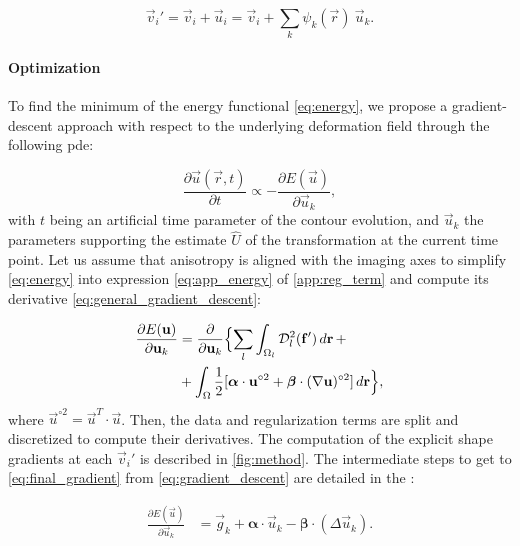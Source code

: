   \begin{equation}
  \vec{v}_i' = \vec{v}_i + \vec{u}_i = \vec{v}_i + \sum_k \psi_k(\vec{r}) \: \vec{u}_k.
  \label{eq:nodes_tfm}
  \end{equation}


\paragraph*{Optimization}
\label{sec:gradient_descent}
To find the minimum of the energy functional \eqref{eq:energy},
  we propose a gradient-descent approach with respect to the underlying
  deformation field through the following \gls*{pde}:

  \begin{equation}
  \frac{\partial \vec{u}(\vec{r},t)}{\partial t} \propto - \frac{\partial E(\vec{u})}{\partial \vec{u}_k},
  \label{eq:general_gradient_descent}
  \end{equation}
%
  with $t$ being an artificial time parameter of the contour
  evolution, and $\vec{u}_k$ the parameters supporting the estimate
  $\hat{U}$ of the transformation at the current time point.
Let us assume that anisotropy is aligned with the imaging axes to simplify
  \eqref{eq:energy} into expression \eqref{eq:app_energy} of \ref{app:reg_term}
  and compute its derivative \eqref{eq:general_gradient_descent}:

  \begin{align}
  \frac{\partial E(\vec{u})}{\partial \vec{u}_k} &=
  \frac{ \partial }{\partial \vec{u}_k} \Big\{
  \underset{l}{\sum} \int_{\Omega_l} \mdist{f'}{l} \,d\vec{r} \, + \notag\\
  &+ \int_{\Omega} \frac12 [ \boldsymbol{\alpha} \cdot \vec{u}^{\circ2}
  + \boldsymbol{\beta} \cdot (\nabla \vec{u})^{\circ2} ] \,d\vec{r}
  \Big\},
  \label{eq:gradient_descent}
  \end{align}
%
  where $\vec{u}^{\circ2} = \vec{u}^T \cdot \vec{u}$.
Then, the data and regularization terms are split and discretized to compute their
  derivatives.
The computation of the explicit shape gradients at each $\vec{v}_i'$ is described in \autoref{fig:method}.
The intermediate steps to get to \eqref{eq:final_gradient} from \eqref{eq:gradient_descent} are
  detailed in the :

  \begin{align}
  \frac{\partial E(\vec{u})}{\partial \vec{u}_k} &=
  \vec{g}_k  + \boldsymbol{\alpha} \cdot \vec{u}_k - \boldsymbol{\beta} \cdot (\Delta \vec{u}_k).
  \label{eq:final_gradient}
  \end{align}

